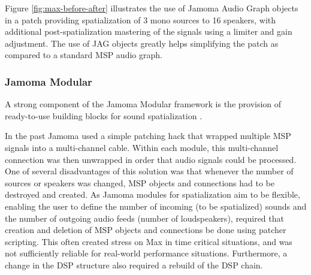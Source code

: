 \documentclass[twoside,a4paper]{article}
\begin{document}
Figure \ref{fig:max-before-after} illustrates the use of Jamoma Audio Graph objects in a patch providing spatialization of 3 mono sources to 16 speakers, with additional post-spatialization mastering of the signals using a limiter and gain adjustment.
The use of JAG objects greatly helps simplifying the patch as compared to a standard MSP audio graph. 



\subsubsection{Jamoma Modular} %

A strong component of the Jamoma Modular framework is the provision of ready-to-use building blocks for sound spatialization \cite{Peters:2009}.

In the past Jamoma used a simple patching hack that wrapped multiple MSP signals into a multi-channel cable. 
Within each module, this multi-channel connection was then unwrapped in order that audio signals could be processed. 
One of several disadvantages of this solution was that whenever the number of sources or speakers was changed, MSP objects and connections had to be destroyed and created.
As Jamoma modules for spatialization aim to be flexible, enabling the user to define the number of incoming (to be spatialized) sounds and the number of outgoing audio feeds (number of loudspeakers), required that creation and deletion of MSP objects and connections be done using patcher scripting.
This often created stress on Max in time critical situations, and was not sufficiently reliable for real-world performance situations.
Furthermore, a change in the DSP structure also required a rebuild of the DSP chain.
\end{document}
